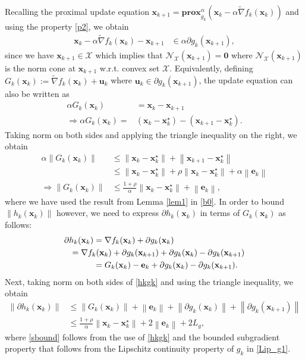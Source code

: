 \documentclass[draftcls,onecolumn,12pt]{IEEEtran}
\theoremstyle{plain}
\def\u{\mathbf{u}}
\def\x{\mathbf{x}}
\def\e{\mathbf{e}}
\def\cX {\mathcal{X}}
\def\xks{\x_k^\star}
\def \nt {\tilde{\nabla}}
\def\prox{\textbf{prox}}
\providecommand{\norm}[1]{\left\|#1\right\|}
\providecommand{\pk}[1]{\prox_{g_k}^\alpha\!\!\left(#1\right)}
\theoremstyle{plain}
\theoremstyle{remark}
\begin{document}
\begin{IEEEproof}	
Recalling the proximal update equation $\x_{k+1} = \pk{\x_k-\alpha\nt f_k(\x_k)}$ and using the property \eqref{p2}, we obtain
\begin{align}
\x_{k}-\alpha\nt f_k(\x_k) -\x_{k+1} &\in \alpha \partial g_k(\x_{k+1}) ,
\end{align}
since we have $\x_{k+1}\in\cX$ which implies that $\boldsymbol{\mathcal{N}}_{\cX}(\x_{k+1}) = \boldsymbol{0}$ where $\boldsymbol{\mathcal{N}}_{\cX}(\x_{k+1})$ is the norm cone at $\x_{k+1}$ w.r.t. convex set $\cX$.
Equivalently, defining $G_k(\x_k):=\nt f_k(\x_k) + \u_k$ where $\u_k \in \partial g_k(\x_{k+1})$, the update equation can also be written as
\begin{align}\label{update}
\alpha G_k(\x_{k}) &= \x_{k} - \x_{k+1} \\
\Rightarrow \alpha G_k(\x_{k}) = & (\x_{k} - \xks) - (\x_{k+1} - \xks).
\end{align}
Taking norm on both sides and applying the triangle inequality on the right, we obtain\begin{align}
\alpha \norm{G_k(\x_{k})} &\leq  \norm{\x_k - \xks} + \norm{\x_{k+1} - \xks} \\
&\leq \norm{\x_{k} - \xks} + \rho \norm{\x_{k} - \xks}  +\alpha\norm{\e_k} \label{b0} \\
\Rightarrow \norm{G_k(\x_{k})} &\leq \frac{1+\rho}{\alpha} \norm{\x_{k} - \xks}    +\norm{\e_k}  \label{b1},
\end{align}
where we have used the result from Lemma \ref{lem1} in \eqref{b0}. In order to bound $\norm{h_k(\x_k)}$ however, we need to express $\partial h_k(\x_{k})$	in terms of $G_k(\x_{k})$ as follows:
\begin{align}
\partial  h_k(\x_{k}) &=  \nabla f_{k}(\x_{k}) + \partial g_{k}(\x_{k}) \\
&\hspace{-1cm}=  \nabla f_{k}(\x_{k}) + \partial g_{k}(\x_{k+1}) + \partial g_{k}(\x_{k}) - \partial g_{k}(\x_{k+1}) \\
&=  G_{k}(\x_{k}) - \e_k  + \partial g_{k}(\x_{k}) - \partial g_{k}(\x_{k+1}) .\label{hkgk}
\end{align}	 
Next, taking norm on both sides of \eqref{hkgk} and using the triangle inequality, we obtain
	  			\begin{align}
	  			\norm{\partial  h_k(\x_{k})} &\leq  \norm{G_{k}(\x_{k})} + \norm{\e_k}  + \norm{\partial g_{k}(\x_{k})} + \norm{\partial g_{k}(\x_{k+1})} \\
					&\leq \frac{1+\rho}{\alpha} \norm{\x_{k} - \xks}  + 2\norm{\e_k}  + 2L_g \label{sbound},
	  			\end{align}
where \eqref{sbound} follows from the use of \eqref{hkgk} and the bounded subgradient property that follows from the Lipschitz continuity  property of $g_k$ in \eqref{Lip_g1}.


\end{IEEEproof}
\end{document}
